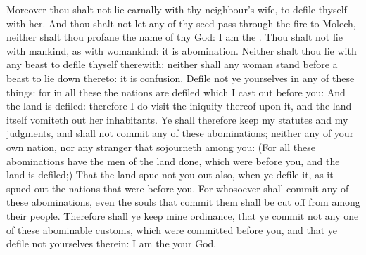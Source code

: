 \begin{biblechapter}
\verse Moreover thou shalt not lie carnally with thy neighbour's wife, to defile thyself with her.
\verse And thou shalt not let any of thy seed pass through the fire to Molech, neither shalt thou profane the name of thy God: I am the \LORD.
\verse Thou shalt not lie with mankind, as with womankind: it is abomination.
\verse Neither shalt thou lie with any beast to defile thyself therewith: neither shall any woman stand before a beast to lie down thereto: it is confusion.
\verse Defile not ye yourselves in any of these things: for in all these the nations are defiled which I cast out before you:
\verse And the land is defiled: therefore I do visit the iniquity thereof upon it, and the land itself vomiteth out her inhabitants.
\verse Ye shall therefore keep my statutes and my judgments, and shall not commit any of these abominations; neither any of your own nation, nor any stranger that sojourneth among you:
\verse (For all these abominations have the men of the land done, which were before you, and the land is defiled;)
\verse That the land spue not you out also, when ye defile it, as it spued out the nations that were before you.
\verse For whosoever shall commit any of these abominations, even the souls that commit them shall be cut off from among their people.
\verse Therefore shall ye keep mine ordinance, that ye commit not any one of these abominable customs, which were committed before you, and that ye defile not yourselves therein: I am the \LORD your God.
\end{biblechapter}

